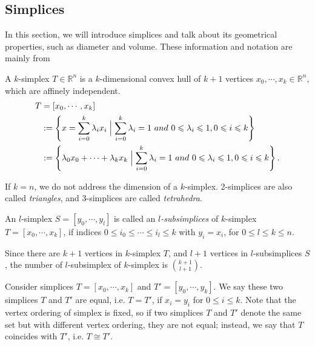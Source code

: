     \subsection{Simplices}
    In this section, we will introduce simplices and talk about its geometrical properties, such as diameter and volume. These information and notation are mainly from \cite{ciarlet2002finite}\cite{bey2000simplicial}
    \noindent
    \begin{definition*}
    A $k$-simplex $T \in \mathbb{R}^n$ is a $k$-dimensional convex hull of $k+1$ vertices ${x}_0, \cdots, {x}_k \in \mathbb{R}^n$, which are affinely independent.
    \begin{equation*}
    \begin{split}
    {T} & = [{x}_0, \cdots, {x}_k ]\\
    & := \left\{{x} = \sum\limits_{i=0}^k \lambda_i {x}_i \Bigm| \sum\limits_{i=0}^k \lambda_i = 1 ~and~ 0 \leqslant \lambda_i \leqslant 1, 0 \leqslant i \leqslant k \right\}\\
    & := \left\{\lambda_0{x}_0 + \cdots + \lambda_k{x}_k \Bigm| \sum\limits_{i=0}^k \lambda_i = 1 ~and~ 0 \leqslant \lambda_i \leqslant 1, 0 \leqslant i \leqslant k \right\}.
    \end{split}
    \end{equation*}
    \end{definition*}
    If $k = n$, we do not address the dimension of a $k$-simplex. 2-simplices are also called \emph{triangles}, and 3-simplices are called \emph{tetrahedra}.

    \begin{definition*}
    An  $l$-simplex ${S} = [{y}_0, \cdots, {y}_l]$ is called an \emph{$l$-subsimplices} of $k$-simplex ${T} = [{x}_0, \cdots, {x}_k]$, if indices $0 \leqslant {i}_0 \leqslant \cdots\leqslant{i}_l \leqslant k$ with ${y}_i = {x}_i$, for $0 \leqslant l \leqslant k \leqslant n$.
    \end{definition*}
    Since there are $k+1$ vertices in $k$-simplex $T$, and $l+1$ vertices in $l$-subsimplices $S$, the number of $l$-subsimplex of $k$-simplex is $\binom{k+1}{l+1}$.


    Consider simplices $T = [{x}_0, \cdots, {x}_k]$ and $T' = [{y}_0, \cdots, {y}_k]$. We say these two simplices $T$ and $T'$ are equal, i.e. $T = T'$, if ${x}_i = {y}_i$ for $0 \leqslant i \leqslant k$. Note that the vertex ordering of simplex is fixed, so if two simplices $T$ and $T'$ denote the same set but with different vertex ordering, they are not equal; instead, we say that ${T}$ coincides with $T'$, i.e. $T \cong T'$.

